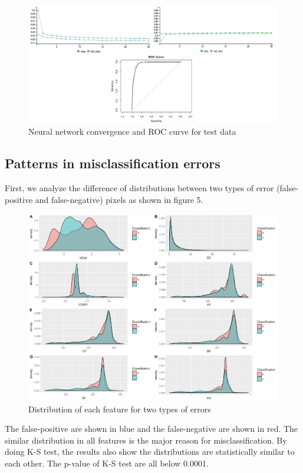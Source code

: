 \documentclass{article}\usepackage[]{graphicx}\usepackage[]{color}
\begin{document}
\begin{figure}[h!]
\caption{Neural network convergence and ROC curve for test data}
\includegraphics[width = \textwidth]{figures/converge.png}
\end{figure}

\subsection{Patterns in misclassification errors}
First, we analyze the difference of distributions between two types of error (false-positive and false-negative) pixels as shown in figure 5.  

\begin{figure}[h!]
\caption{Distribution of each feature for two types of errors}
\includegraphics[width = \textwidth]{figures/2typeserror.png}
\end{figure}

The false-positive are shown in blue and the false-negative are shown in red.
The similar distribution in all features is the major reason for misclassification.
By doing K-S test, the results also show the distributions are statistically similar to each other. The p-value of K-S test are all below 0.0001.
\end{document}
